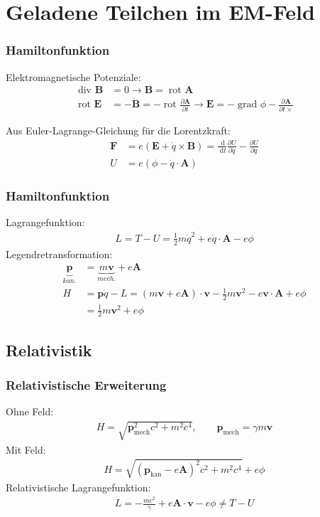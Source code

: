 \documentclass[hyperref={pdfpagelabels=false}]{beamer}
\newcommand {\rot} {\; \mathrm{rot} \,}         %
\newcommand {\grad} {\; \mathrm{grad} \,}       %
\newcommand {\dive} {\; \mathrm{div} \,}        %
\newcommand {\dx} {\; \mathrm{d} }              %
\begin{document}
\section{Geladene Teilchen im EM-Feld}
\begin{frame}
 \frametitle{Hamiltonfunktion}
 \pause
 Elektromagnetische Potenziale:
 \begin{align*}
  \dive\, \mathbf{ B} &= 0 \rightarrow \mathbf{B} = \rot\, \mathbf{A}\\
  \rot\,\mathbf{ E}  &= -\dot {\mathbf{B}} = -\rot\, \frac{\partial\mathbf{A}}{\partial t} \rightarrow \mathbf{E} = -\grad\,\phi - \frac{\partial\mathbf{A}}{\partial t×}
 \end{align*}
 
 Aus Euler-Lagrange-Gleichung für die Lorentzkraft: 
 \begin{align*}
   \mathbf{F} &= e(\mathbf{E} + \dot {q}\times \mathbf{B}) = \frac{\dx}{\dx t} \frac{\partial U}{\partial \dot {q}} - \frac{\partial U}{\partial q}\\
   U &= e(\phi - \dot{q}\cdot\mathbf{A})
 \end{align*}
 
\end{frame}

\begin{frame}
 \frametitle{Hamiltonfunktion}
 \pause
 Lagrangefunktion:
 \begin{align*}
  L = T-U = \frac12 m \dot{q}^2 + e\dot{q}\cdot\mathbf{A} - e\phi
 \end{align*}
 Legendretransformation:
 \begin{align*}
  \underbrace{\mathbf{p}}_{kan.} &= \underbrace{m\mathbf{v}}_{mech.} + e\mathbf{A}\\
  H &= \mathbf{p}\dot{q} - L = (m\mathbf{v}+e\mathbf{A})\cdot \mathbf{v} - \frac12 m \mathbf{v}^2 - e \mathbf{v}\cdot\mathbf{A} + e\phi \\
  &= \frac12m\mathbf{v}^2 + e\phi
 \end{align*}
\end{frame}


\subsection{Relativistik}
 \begin{frame}
    \frametitle{Relativistische Erweiterung}
    \pause
  Ohne Feld:
  \begin{align*}
    H = \sqrt{\mathbf{p}^2_{\text{mech}}c^2 + m^2c^4},    \qquad \mathbf{p}_{\text{mech}} = \gamma m\mathbf{v}
  \end{align*}
  Mit Feld:
  \begin{align*}
   H = \sqrt{(\mathbf{p}_{\text{kan}}-e\mathbf{A})^2c^2 + m^2c^4}+e\phi
  \end{align*}
  Relativistische Lagrangefunktion:
  \begin{align*}
   L = -\frac{mc^2}{\gamma} + e \mathbf{A}\cdot\mathbf{v}-e\phi \neq T-U
  \end{align*}

 \end{frame}
\end{document}
